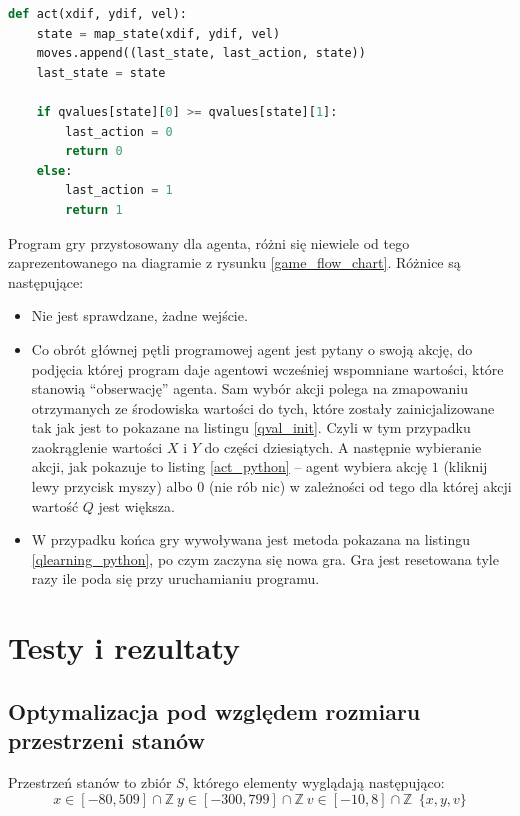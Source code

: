 \documentclass[a4paper, 12pt,twoside]{report}
\begin{document}
\begin{lstlisting}[language=Python, label={act_python},
caption={Metoda wybierająca akcję agenta.}, captionpos=t]
def act(xdif, ydif, vel):
    state = map_state(xdif, ydif, vel)
    moves.append((last_state, last_action, state))
    last_state = state

    if qvalues[state][0] >= qvalues[state][1]:
        last_action = 0
        return 0
    else:
        last_action = 1
        return 1
\end{lstlisting}
Program gry przystosowany dla agenta, różni się niewiele od tego
zaprezentowanego na diagramie z rysunku \ref{game_flow_chart}. Różnice są
następujące:
\begin{itemize}
\setlength\itemsep{-0.4em}
\item Nie jest sprawdzane, żadne wejście.
\item Co obrót głównej pętli programowej agent jest pytany o swoją akcję, do
	podjęcia której program daje agentowi wcześniej wspomniane wartości,
	które stanowią ``obserwację'' agenta. Sam wybór akcji polega na
	zmapowaniu otrzymanych ze środowiska wartości do tych, które zostały
	zainicjalizowane tak jak jest to pokazane na listingu \ref{qval_init}.
	Czyli w tym przypadku zaokrąglenie wartości $X$ i $Y$ do części
	dziesiątych. A następnie wybieranie akcji, jak pokazuje to
	listing \ref{act_python} -- agent wybiera akcję $1$ (kliknij lewy
	przycisk myszy) albo $0$ (nie rób nic) w zależności od tego dla której
	akcji wartość $Q$ jest większa.
\item W przypadku końca gry wywoływana jest metoda pokazana na listingu
	\ref{qlearning_python},  po czym zaczyna się nowa gra. Gra jest
	resetowana tyle razy ile poda się przy uruchamianiu programu.
\end{itemize}

\chapter{Testy i rezultaty}
\label{chapter:testy}
\section{Optymalizacja pod względem rozmiaru przestrzeni stanów}
Przestrzeń stanów to zbiór $S$, którego elementy wyglądają następująco:
\[x \in [-80, 509] \cap \mathbb{Z} \ y \in [-300,799] \cap
\mathbb{Z} \ v \in [-10,8] \cap \mathbb{Z}\ \  \{x, y, v\}\]
\end{document}
